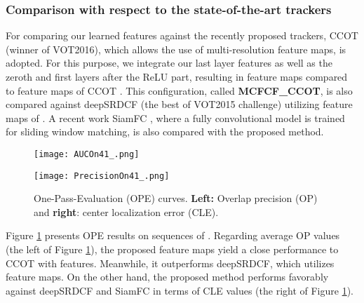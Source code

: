 \documentclass[journal]{IEEEtran}
\begin{document}
\subsubsection{Comparison with respect to the state-of-the-art trackers}
For comparing our learned features against the recently proposed trackers, CCOT \cite{CCOT} (winner of VOT2016), which allows the use of multi-resolution feature maps, is adopted. For this purpose, we integrate our last layer features as well as the zeroth and first layers after the ReLU part, resulting in  feature maps compared to  feature maps of CCOT \cite{CCOT}. This configuration, called \textbf{MCFCF\_CCOT}, is also compared against deepSRDCF \cite{deepSRDCF} (the  best of VOT2015 challenge) utilizing  feature maps of \cite{VGG}. A recent work SiamFC \cite{SiamFC}, where a fully convolutional model is trained for sliding window matching, is also compared with the proposed method.

\begin{figure}
\begin{minipage}[t]{0.495\linewidth}
\centering
\texttt{[image: AUCOn41\_.png]} 
\end{minipage}
\hfill
\begin{minipage}[t]{0.495\linewidth}
\centering
\texttt{[image: PrecisionOn41\_.png]} 
\end{minipage}
\caption{\label{OPEFIG}\small One-Pass-Evaluation (OPE) curves. \textbf{Left:} Overlap precision (OP) and \textbf{right}: center localization error (CLE).}
\end{figure}
\normalsize
Figure \ref{OPEFIG} presents OPE results on  sequences of \cite{Benchmark2013}. Regarding average OP values (the left of Figure \ref{OPEFIG}), the proposed  feature maps yield a close performance to CCOT with  features. Meanwhile, it outperforms deepSRDCF, which utilizes  feature maps. On the other hand, the proposed method performs favorably against deepSRDCF and SiamFC in terms of CLE values (the right of Figure \ref{OPEFIG}).
\end{document}
